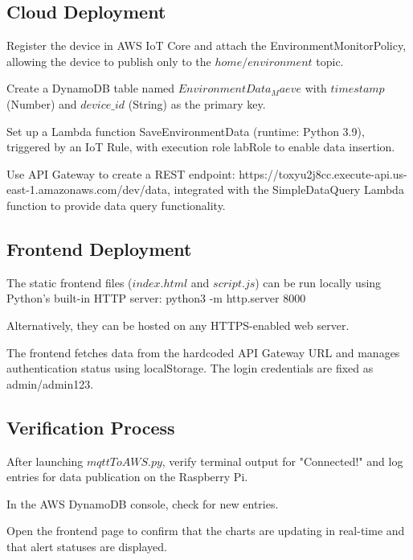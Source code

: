 \documentclass[12pt,a4paper]{article}
\begin{document}
  
\subsection{Cloud Deployment}
Register the device in AWS IoT Core and attach the EnvironmentMonitorPolicy, allowing the device to publish only to the $home/environment$ topic.

\vspace{\baselineskip}
\noindent
Create a DynamoDB table named $EnvironmentData_Maeve$ with $timestamp$ (Number) and $device\_id$ (String) as the primary key.

\vspace{\baselineskip}
\noindent
Set up a Lambda function SaveEnvironmentData (runtime: Python 3.9), triggered by an IoT Rule, with execution role labRole to enable data insertion.

\vspace{\baselineskip}
\noindent
Use API Gateway to create a REST endpoint: https://toxyu2j8cc.execute-api.us-east-1.amazonaws.com/dev/data, integrated with the SimpleDataQuery Lambda function to provide data query functionality.


\subsection{Frontend Deployment}
The static frontend files ($index.html$ and $script.js$) can be run locally using Python's built-in HTTP server: python3 -m http.server 8000

\vspace{\baselineskip}
\noindent
Alternatively, they can be hosted on any HTTPS-enabled web server.

\vspace{\baselineskip}
\noindent
The frontend fetches data from the hardcoded API Gateway URL and manages authentication status using localStorage. The login credentials are fixed as admin/admin123.

\subsection{Verification Process}
After launching $mqttToAWS.py$, verify terminal output for "Connected!" and log entries for data publication on the Raspberry Pi.

\vspace{\baselineskip}
\noindent
In the AWS DynamoDB console, check for new entries.

\vspace{\baselineskip}
\noindent
Open the frontend page to confirm that the charts are updating in real-time and that alert statuses are displayed.
\end{document}
